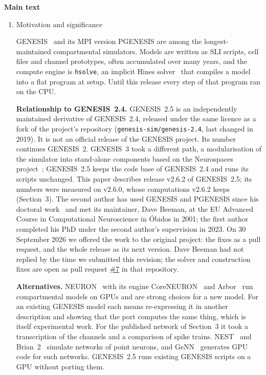 \documentclass[preprint,12pt,a4paper]{elsarticle}
\begin{document}
\textbf{Main text}\\
\begin{enumerate}

\item Motivation and significance

GENESIS~\cite{bower1998} and its MPI version PGENESIS are among the
longest-maintained compartmental simulators. Models are written as SLI scripts,
cell files and channel prototypes, often accumulated over many years, and the
compute engine is \texttt{hsolve}, an implicit Hines solver~\cite{hines1984efficient}
that compiles a model into a flat program at setup. Until this release every step of
that program ran on the CPU.

\textbf{Relationship to GENESIS~2.4.} %
GENESIS~2.5 is an independently maintained derivative of GENESIS~2.4, released under
the same licence as a fork of the project's repository (\texttt{genesis-sim/genesis-2.4},
last changed in 2019). It is not an official release of the GENESIS project. Its number
continues GENESIS~2. GENESIS~3 took a different path, a modularisation of the simulator
into stand-alone components based on the Neurospaces
project~\cite{cornelis2007dendrite,cornelis2008cbi,cornelis2011,cornelis2012python,cornelis2013interop};
GENESIS~2.5 keeps the code base of GENESIS~2.4 and runs its scripts unchanged. This paper
describes release v2.6.2 of GENESIS~2.5; its numbers were measured on v2.6.0, whose
computations v2.6.2 keeps (Section~3). The second
author has used GENESIS and PGENESIS since his doctoral work~\cite{wojcik2004lsm} and
met its maintainer, Dave Beeman, at the EU Advanced Course in Computational
Neuroscience in \'Obidos in 2001; the first author completed his PhD under the second
author's supervision in 2023. On 30 September 2026
we offered the work to the original project: the fixes as a pull request, and
the whole release as its next version. Dave Beeman had not replied by the time we
submitted this revision; the solver and construction fixes are open as pull request
\href{https://github.com/genesis-sim/genesis-2.4/pull/7}{\#7} in that repository.

\textbf{Alternatives.} NEURON~\cite{hines1997neuron} with its engine
CoreNEURON~\cite{kumbhar2019coreneuron} and Arbor~\cite{arbor2019} run compartmental
models on GPUs and are strong choices for a new model. For an existing GENESIS model
each means re-expressing it in another description and showing that the port computes
the same thing, which is itself experimental work. For the published network of
Section~3 it took a transcription of the channels and a comparison of spike trains.
NEST~\cite{gewaltig2007nest} and Brian~2~\cite{stimberg2019brian} simulate networks of
point neurons, and GeNN~\cite{yavuz2016genn} generates GPU code for such networks.
GENESIS~2.5 runs existing GENESIS scripts on a GPU without porting them.


\end{enumerate}
\end{document}
